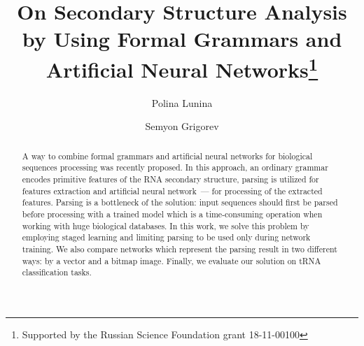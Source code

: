 \documentclass[runningheads]{llncs}
\begin{document}
%
\title{On Secondary Structure Analysis by Using Formal Grammars and Artificial Neural Networks\thanks{Supported by the Russian Science Foundation grant 18-11-00100}}
%
%
\author{Polina Lunina \Letter \and
Semyon Grigorev}
%
%
%
\maketitle              %
%
\begin{abstract}
A way to combine formal grammars and artificial neural networks for biological sequences processing was recently proposed.
In this approach, an ordinary grammar encodes primitive features of the RNA secondary structure, parsing is utilized for features extraction and artificial neural network~--- for processing of the extracted features.
Parsing is a bottleneck of the solution: input sequences should first be parsed before processing with a trained model which is a time-consuming operation when working with huge biological databases.
In this work, we solve this problem by employing staged learning and limiting parsing to be used only during network training.
We also compare networks which represent the parsing result in two different ways: by a vector and a bitmap image.
Finally, we evaluate our solution on tRNA classification tasks.

\end{abstract}
%
%
%







%
%
%


\end{document}
